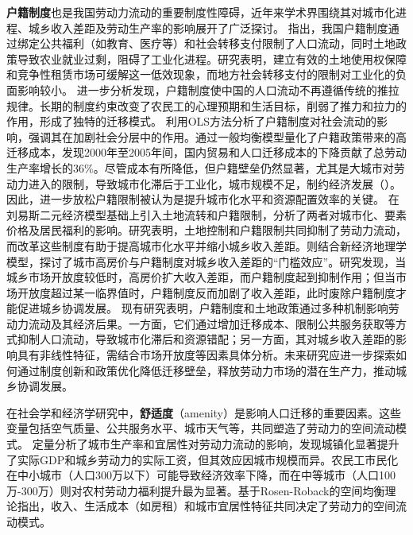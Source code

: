 \documentclass[a4paper,12pt,oneside, fontset=mac]{ctexbook} %
\begin{document}
\textbf{户籍制度}也是我国劳动力流动的重要制度性障碍，近年来学术界围绕其对城市化进程、城乡收入差距及劳动生产率的影响展开了广泛探讨。
\cite{ngaiChinasMobilityBarriers2019}指出，我国户籍制度通过绑定公共福利（如教育、医疗等）和社会转移支付限制了人口流动，同时土地政策导致农业就业过剩，阻碍了工业化进程。研究表明，建立有效的土地使用权保障和竞争性租赁市场可缓解这一低效现象，而地方社会转移支付的限制对工业化的负面影响较小。
\cite{LiQiangYingXiangZhongGuoChengXiangLiuDongRenKouDeTuiLiYuLaLiYinSuFenXi2003}进一步分析发现，户籍制度使中国的人口流动不再遵循传统的推拉规律。长期的制度约束改变了农民工的心理预期和生活目标，削弱了推力和拉力的作用，形成了独特的迁移模式。
\cite{LuYiLongHuKouHuanQiZuoYongMaHuJiZhiDuYuSheHuiFenCengHeLiuDong2008}利用OLS方法分析了户籍制度对社会流动的影响，强调其在加剧社会分层中的作用。\cite{tombeTradeMigrationProductivity2019}通过一般均衡模型量化了户籍政策带来的高迁移成本，发现2000年至2005年间，国内贸易和人口迁移成本的下降贡献了总劳动生产率增长的36\%。尽管成本有所降低，但户籍壁垒仍然显著，尤其是大城市对劳动力进入的限制，导致城市化滞后于工业化，城市规模不足，制约经济发展（\cite{WangLiLiWoGuoRenKouQianYiChengBenChengShiGuiMoYuShengChanLu2020}）。因此，进一步放松户籍限制被认为是提升城市化水平和资源配置效率的关键。
\cite{ZhouWenTuDiLiuZhuanHuJiZhiDuGaiGeYuZhongGuoChengShiHuaLiLunYuMoNi2017}在刘易斯二元经济模型基础上引入土地流转和户籍限制，分析了两者对城市化、要素价格及居民福利的影响。研究表明，土地控制和户籍限制共同抑制了劳动力流动，而改革这些制度有助于提高城市化水平并缩小城乡收入差距。\cite{AnHuSenChengShiGaoFangJieHeHuJiZhiDuCuJinHuoYiZhiChengXiangShouRuChaiJuKuoDaZhongGuoLaoDongLiLiuDongHeShouRuChaiJuKuoDaBeiLunDeYiGeJieShi2011}则结合新经济地理学模型，探讨了城市高房价与户籍制度对城乡收入差距的“门槛效应”。研究发现，当城乡市场开放度较低时，高房价扩大收入差距，而户籍制度起到抑制作用；但当市场开放度超过某一临界值时，户籍制度反而加剧了收入差距，此时废除户籍制度才能促进城乡协调发展。
现有研究表明，户籍制度和土地政策通过多种机制影响劳动力流动及其经济后果。一方面，它们通过增加迁移成本、限制公共服务获取等方式抑制人口流动，导致城市化滞后和资源错配；另一方面，其对城乡收入差距的影响具有非线性特征，需结合市场开放度等因素具体分析。未来研究应进一步探索如何通过制度创新和政策优化降低迁移壁垒，释放劳动力市场的潜在生产力，推动城乡协调发展。


在社会学和经济学研究中，\textbf{舒适度}（amenity）是影响人口迁移的重要因素。这些变量包括空气质量、公共服务水平、城市天气等，共同塑造了劳动力的空间流动模式。
\cite{YangXiChengShiGuiMoYuChengZhenHuaNongMinGongShiMinHuaDeJingJiXiaoYingJiYuChengShiShengChanLuYuYiJuDuChaiYiDeDingLiangFenXi2017}定量分析了城市生产率和宜居性对劳动力流动的影响，发现城镇化显著提升了实际GDP和城乡劳动力的实际工资，但其效应因城市规模而异。农民工市民化在中小城市（人口300万以下）可能导致经济效率下降，而在中等城市（人口100万-300万）则对农村劳动力福利提升最为显著。\cite{WangLiNuoJiYuYaLiMenJianJiaShuoDeJiaTingQianJuYiXiangXingChengJiZhiYanJiuYiHangZhouShiQuWeiLi2007}基于Rosen-Roback的空间均衡理论指出，收入、生活成本（如房租）和城市宜居性特征共同决定了劳动力的空间流动模式。
\end{document}
